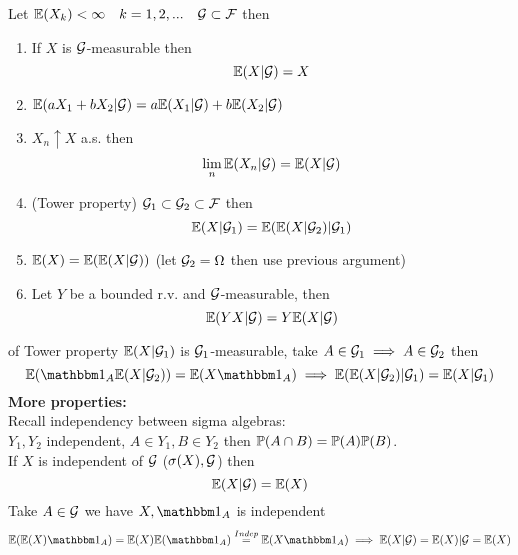 \begin{thm}
Let $\mathbb{E}(X_k) <\infty \quad k = 1,2,... \quad \mathcal{G}\subset\mathcal{F}$ then
\begin{enumerate}
    \item If $X$ is $\mathcal{G}$-measurable then \begin{equation*}
        \mathbb{E}(X|\mathcal{G}) = X
    \end{equation*}
    \item $\mathbb{E}(aX_1 + bX_2 |\mathcal{G}) = a\mathbb{E}(X_1|\mathcal{G})+b\mathbb{E}(X_2 |\mathcal{G})$
    \item $X_n \uparrow X$ a.s. then \begin{equation*}
        \lim\limits_{n} \mathbb{E}(X_n|\mathcal{G}) = \mathbb{E}(X|\mathcal{G})
    \end{equation*}
    \item (Tower property) $\mathcal{G}_1\subset\mathcal{G}_2\subset\mathcal{F}$ then
    \begin{equation*}
        \mathbb{E}(X|\mathcal{G}_1) = \mathbb{E}(\mathbb{E}(X|\mathcal{G}_2)|\mathcal{G}_1)
    \end{equation*}
    \item $\mathbb{E}(X) = \mathbb{E}(\mathbb{E}(X|\mathcal{G}))$ (let $\mathcal{G}_2 = \Omega$ then use previous argument)
    \item Let $Y$ be a bounded r.v. and $\mathcal{G}$-measurable, then \begin{equation*}
        \mathbb{E}(YX|\mathcal{G}) = Y\mathbb{E}(X|\mathcal{G})
    \end{equation*}
\end{enumerate}
\end{thm}

\newpage
\pf of Tower property
$\mathbb{E}(X|\mathcal{G}_1)$ is $\mathcal{G}_1$-measurable, take $A\in \mathcal{G}_1 \implies A\in \mathcal{G}_2$ then 
\begin{equation*}
    \E(\I_A \E(X|\setg_2)) = \E(X\I_A) \implies \E(\E(X|\setg_2)|\setg_1) = \E(X|\setg_1) 
\end{equation*}
\textbf{More properties:} \\
Recall independency between sigma algebras: \\
$Y_1, Y_2$ independent, $A\in Y_1, B\in Y_2$ then $\mathbb{P}(A\cap B) = \mathbb{P}(A)\mathbb{P}(B)$. \\
If $X$ is independent of $\mathcal{G}$ ($\sigma(X), \mathcal{G}$) then \begin{equation*}
    \mathbb{E}(X|\mathcal{G}) = \mathbb{E}(X)
\end{equation*}
\pf Take $A\in\mathcal{G}$ we have $X, \I_A$ is independent
\begin{align*}
    \E(\E(X)\I_A) = \E(X)\E(\I_A)\stackrel{Indep}{=} \E(X\I_A) \implies \E(X|\setg) = \E(X)|\setg = \E(X)
\end{align*}

